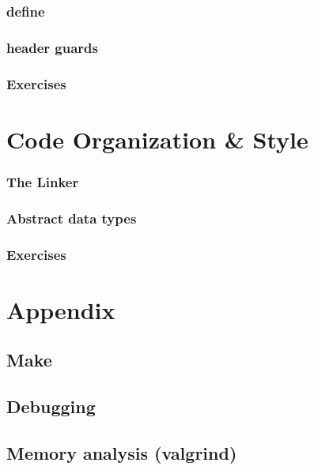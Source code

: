 \documentclass[ebook,11pt,oneside,openany]{memoir}
\begin{document}
\subsection{define}
\subsection{header guards}
\subsection{Exercises}

\chapter{Code Organization \& Style}
\label{ch:org}
\subsection{The Linker}
\subsection{Abstract data types}
\subsection{Exercises}

\chapter{Appendix}
\section{Make}
\section{Debugging}
\section{Memory analysis (valgrind)}
\end{document}
